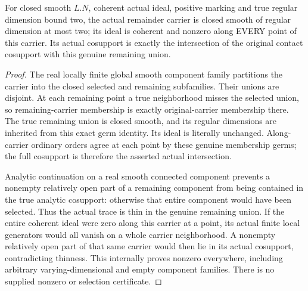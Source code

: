 \begin{theorem}
\label{hir:zero-contact-remainder-geometry-nonzero}
\leanok
{}
For closed smooth $L.N$, coherent actual ideal, positive marking and true
regular dimension bound two, the actual remainder carrier is closed smooth
of regular dimension at most two; its ideal is coherent and nonzero along
EVERY point of this carrier. Its actual cosupport is exactly the intersection
of the original contact cosupport with this genuine remaining union.
\end{theorem}
\begin{proof}
The real locally finite global smooth component family partitions the carrier
into the closed selected and remaining subfamilies. Their unions are disjoint.
At each remaining point a true neighborhood misses the selected union, so
remaining-carrier membership is exactly original-carrier membership there.
The true remaining union is closed smooth, and its regular dimensions are
inherited from this exact germ identity. Its ideal is literally unchanged.
Along-carrier ordinary orders agree at each point by these genuine membership
germs; the full cosupport is therefore the asserted actual intersection.

Analytic continuation on a real smooth connected component prevents a
nonempty relatively open part of a remaining component from being contained
in the true analytic cosupport: otherwise that entire component would have
been selected. Thus the actual trace is thin in the genuine remaining union.
If the entire coherent ideal were zero along this carrier at a point, its
actual finite local generators would all vanish on a whole carrier
neighborhood. A nonempty relatively open part of that same carrier would
then lie in its actual cosupport, contradicting thinness. This internally
proves nonzero everywhere, including arbitrary varying-dimensional and empty
component families. There is no supplied nonzero or selection certificate.
\end{proof}

